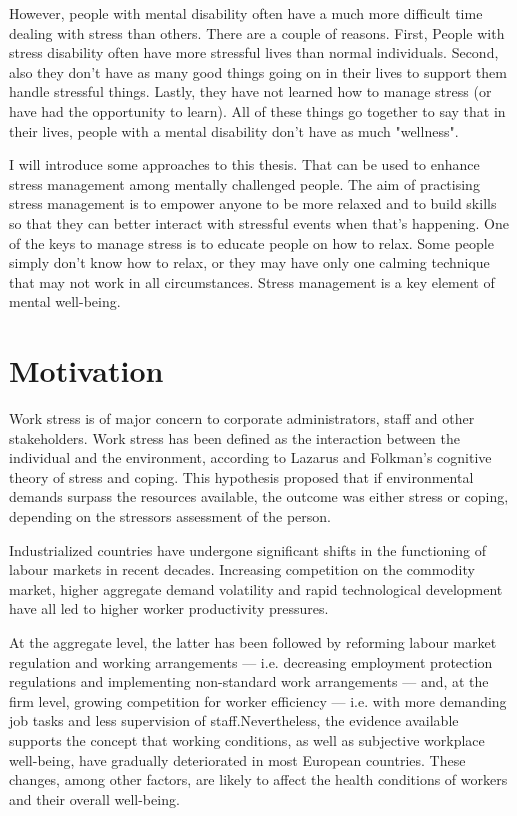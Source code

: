 However, people with mental disability often have a much more difficult time dealing with stress than others. There are a couple of reasons. First, People with stress disability often have more stressful lives than normal individuals. Second, also they don't have as many good things going on in their lives to support them handle stressful things. Lastly, they have not learned how to manage stress (or have had the opportunity to learn). All of these things go together to say that in their lives, people with a mental disability don't have as much "wellness".

I will introduce some approaches to this thesis. That can be used to enhance stress management among mentally challenged people. The aim of practising stress management is to empower anyone to be more relaxed and to build skills so that they can better interact with stressful events when that's happening.
One of the keys to manage stress is to educate people on how to relax. Some people simply don't know how to relax, or they may have only one calming technique that may not work in all circumstances. Stress management is a key element of mental well-being.

\section{Motivation}
Work stress is of major concern to corporate administrators, staff and other stakeholders. Work stress has been defined as the interaction between the individual and the environment, according to Lazarus and Folkman's cognitive theory of stress and coping\citep{LazarusR.S.Folkman1984StressCoping.}. This hypothesis proposed that if environmental demands surpass the resources available, the outcome was either stress or coping, depending on the stressors assessment of the person.

Industrialized countries have undergone significant shifts in the functioning of labour markets in recent decades. Increasing competition on the commodity market, higher aggregate demand volatility and rapid technological development have all led to higher worker productivity pressures. 

At the aggregate level, the latter has been followed by reforming labour market regulation and working arrangements — i.e. decreasing employment protection regulations and implementing non-standard work arrangements — and, at the firm level, growing competition for worker efficiency — i.e. with more demanding job tasks and less supervision of staff\citep{Cottini2013MentalEurope}.Nevertheless, the evidence available supports the concept that working conditions, as well as subjective workplace well-being, have gradually deteriorated in most European countries\citep{Llena-Nozal2009TheCountries}. These changes, among other factors, are likely to affect the health conditions of workers and their overall well-being.

